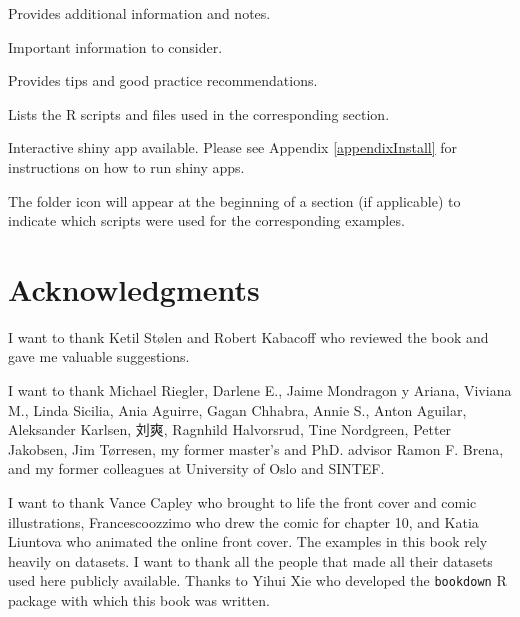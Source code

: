 \documentclass[
  11pt,
]{krantz}
\makeatletter
\newenvironment{kframe}{%
\medskip{}
\setlength{\fboxsep}{.8em}
 \def\at@end@of@kframe{}%
 \ifinner\ifhmode%
  \def\at@end@of@kframe{\end{minipage}}%
  \begin{minipage}{\columnwidth}%
 \fi\fi%
 \def\FrameCommand##1{\hskip\@totalleftmargin \hskip-\fboxsep
 \colorbox{shadecolor}{##1}\hskip-\fboxsep
     \hskip-\linewidth \hskip-\@totalleftmargin \hskip\columnwidth}%
 \MakeFramed {\advance\hsize-\width
   \@totalleftmargin\z@ \linewidth\hsize
   \@setminipage}}%
 {\par\unskip\endMakeFramed%
 \at@end@of@kframe}
\newenvironment{rmdblock}[1]
  {
  \begin{itemize}
  \renewcommand{\labelitemi}{
    \raisebox{-.7\height}[0pt][0pt]{
      {\setkeys{Gin}{width=3em,keepaspectratio}\texttt{[image: images/icons/\#1]}}
    }
  }
  \setlength{\fboxsep}{1em}
  \begin{kframe}
  \item
  }
  {
  \end{kframe}
  \end{itemize}
  }
\newenvironment{rmdcaution}
  {\begin{rmdblock}{caution}}
  {\end{rmdblock}}
\newenvironment{rmdinfo}
  {\begin{rmdblock}{info}}
  {\end{rmdblock}}
\newenvironment{rmdfolder}
  {\begin{rmdblock}{folder}}
  {\end{rmdblock}}
\newenvironment{rmdgoodpractice}
  {\begin{rmdblock}{goodpractice}}
  {\end{rmdblock}}
\newenvironment{rmdshiny}
  {\begin{rmdblock}{touch}}
  {\end{rmdblock}}
\makeatother
\begin{document}
\begin{rmdinfo}
Provides additional information and notes.
\end{rmdinfo}

\begin{rmdcaution}
Important information to consider.
\end{rmdcaution}

\begin{rmdgoodpractice}
Provides tips and good practice recommendations.
\end{rmdgoodpractice}

\begin{rmdfolder}
Lists the R scripts and files used in the corresponding section.
\end{rmdfolder}

\begin{rmdshiny}
Interactive shiny app available. Please see Appendix \ref{appendixInstall} for instructions on how to run shiny apps.
\end{rmdshiny}

The folder icon will appear at the beginning of a section (if applicable) to indicate which scripts were used for the corresponding examples.

\newpage

\hypertarget{acknowledgments}{%
\section*{Acknowledgments}\label{acknowledgments}}


I want to thank Ketil Stølen and Robert Kabacoff who reviewed the book and gave me valuable suggestions.

I want to thank Michael Riegler, Darlene E., Jaime Mondragon y Ariana, Viviana M., Linda Sicilia, Ania Aguirre, Gagan Chhabra, Annie S., Anton Aguilar, Aleksander Karlsen, 刘爽, Ragnhild Halvorsrud, Tine Nordgreen, Petter Jakobsen, Jim Tørresen, my former master's and PhD. advisor Ramon F. Brena, and my former colleagues at University of Oslo and SINTEF.

I want to thank Vance Capley who brought to life the front cover and comic illustrations, Francescoozzimo who drew the comic for chapter 10, and Katia Liuntova who animated the online front cover. The examples in this book rely heavily on datasets. I want to thank all the people that made all their datasets used here publicly available. Thanks to Yihui Xie who developed the \texttt{bookdown} R package with which this book was written.
\end{document}
